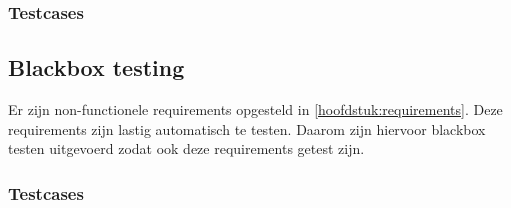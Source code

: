 \subsubsection{Testcases}



\subsection{Blackbox testing}
Er zijn non-functionele requirements opgesteld in \autoref{hoofdstuk:requirements}. Deze requirements zijn lastig automatisch te testen. Daarom zijn hiervoor blackbox testen uitgevoerd zodat ook deze requirements getest zijn.

\subsubsection{Testcases}
